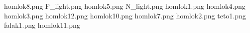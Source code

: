 homlok8.png
F_light.png
homlok5.png
N_light.png
homlok1.png
homlok4.png
homlok3.png
homlok12.png
homlok10.png
homlok7.png
homlok2.png
teto1.png
falak1.png
homlok11.png
